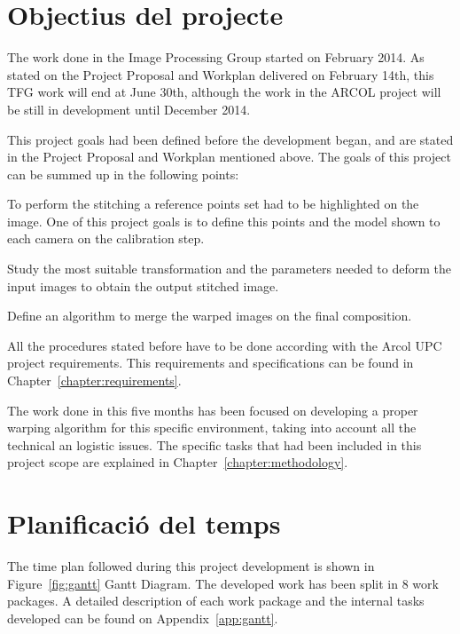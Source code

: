 \section{Objectius del projecte}
The work done in the Image Processing Group started on February 2014. As stated on the Project Proposal and Workplan delivered on February 14th, this TFG work will end at June 30th, although the work in the ARCOL project will be still in development until December 2014.

This project goals had been defined before the development began, and are stated in the Project Proposal and Workplan mentioned above. The goals of this project can be summed up in the following points:
\vspace{-0.5em}
\begin{description}[font=\normalfont\textsl]
\item [Representative points automatic detection.] To perform the stitching a reference points set had to be highlighted on the image. One of this project goals is to define this points and the model shown to each camera on the calibration step.
\item [Estimate the warping parameters. ] Study the most suitable transformation and the parameters needed to deform the input images to obtain the output stitched image.
\item [Blending the results on the final stitching. ] Define an algorithm to merge the warped images on the final composition.
\item [Follow the requirements stated by the Arcol project. ]All the procedures stated before have to be done according with the Arcol UPC project requirements. This requirements and specifications can be found in Chapter~\ref{chapter:requirements}. 
\end{description}

The work done in this five months has been focused on developing a proper warping algorithm for this specific environment, taking into account all the technical an logistic issues. The specific tasks that had been included in  this project scope are explained in Chapter~\ref{chapter:methodology}.

\section{Planificació del temps}

The time plan followed during this project development is shown in Figure~\ref{fig:gantt} Gantt Diagram. The developed work has been split in 8 work packages. A detailed description of each work package and the internal tasks developed can be found on Appendix~\ref{app:gantt}. 

